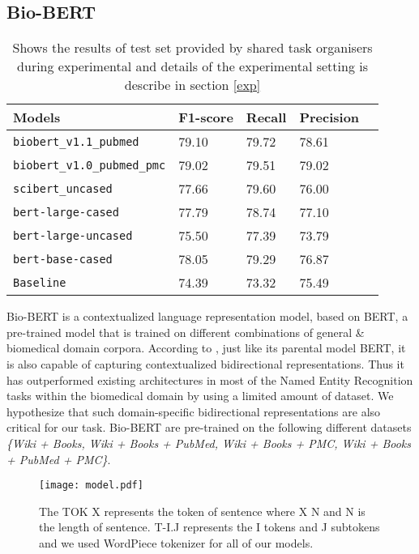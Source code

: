 \documentclass[11pt,a4paper]{article}
\begin{document}
\subsection{Bio-BERT} \label{bio}




\begin{table*}
\centering
\begin{tabular}{lllll}
\hline
\textbf{Models} & \textbf{F1-score} & \textbf{Recall} & \textbf{Precision}\\
\hline
\verb|biobert_v1.1_pubmed| & 79.10 &  79.72 & 78.61 \\ 
\verb|biobert_v1.0_pubmed_pmc|  & 79.02 &  79.51 & 79.02 \\
\verb|scibert_uncased|  & 77.66 &  79.60 & 76.00 \\
\verb|bert-large-cased|  & 77.79  &  78.74 & 77.10 \\ 
\verb|bert-large-uncased|  & 75.50 &  77.39 & 73.79 \\ 
\verb|bert-base-cased|  &  78.05 &  79.29 & 76.87  \\
\verb|Baseline |  & 74.39  &  73.32 & 75.49 \\\hline
\end{tabular}

\caption{\label{result} 
{Shows the results of test set provided by shared task organisers during experimental and details of the experimental setting is describe in section \ref{exp}}
}

\end{table*}
Bio-BERT \cite{10.1093/bioinformatics/btz682} is a contextualized language representation model, based on BERT, a pre-trained model that is trained on different combinations of general \& biomedical domain corpora.
According to \citet{10.1093/bioinformatics/btz682}, just like its parental model BERT, it is also capable of capturing contextualized bidirectional representations. Thus it has outperformed existing architectures in most of the Named Entity Recognition tasks within the biomedical domain by using a limited amount of dataset. We hypothesize that such domain-specific bidirectional representations are also critical for our task. Bio-BERT are pre-trained on the following different datasets \textit{\{Wiki + Books, Wiki + Books + PubMed, Wiki + Books + PMC, Wiki + Books + PubMed + PMC\}}.



\begin{figure}
\centering
\texttt{[image: model.pdf]}
    \caption{The TOK X represents the token of sentence where X  N and N is the length of sentence. T-I.J represents the I tokens and J subtokens and we used WordPiece tokenizer for all of our models.}
    \label{fig:model}
\end{figure}
\end{document}
